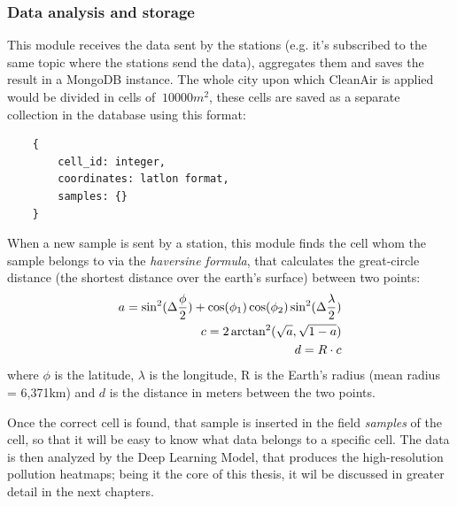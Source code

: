 \documentclass[11pt,a4paper,titlepage]{book}
\begin{document}
\subsubsection{Data analysis and storage}
This module receives the data sent by the stations (e.g. it's subscribed to the same topic where the stations send the data), aggregates them and saves the result in a MongoDB instance.
\newline
\newline
The whole city upon which CleanAir is applied would be divided in cells of $~10000m^2$, these cells are saved as a separate collection in the database using this format:
\begin{center}
\begin{verbatim}
    {
        cell_id: integer,
        coordinates: latlon format,
        samples: {}
    }
\end{verbatim}
\end{center}
When a new sample is sent by a station, this module finds the cell whom the sample belongs to via the \textit{haversine formula}, that calculates the great-circle distance (the shortest distance over the earth's surface) between two points:
\begin{align}
    \label{haversine_formula}
    \notag a = \sin^2(\Delta \frac{\phi}{2}) + \cos(\phi_1) \cos(\phi_2) \sin^2(\Delta \frac{\lambda}{2}) \\ 
    \notag c = 2 \arctan^2(\sqrt{a}, \sqrt{1-a}) \\
    d = R \cdot c
\end{align}
where $\phi$ is the latitude, $\lambda$ is the longitude, R is the Earth's radius (mean radius = 6,371km) and $d$ is the distance in meters between the two points.

Once the correct cell is found, that sample is inserted in the field \textit{samples} of the cell, so that it will be easy to know what data belongs to a specific cell.
\newline
\newline
The data is then analyzed by the Deep Learning Model, that produces the high-resolution pollution heatmaps; being it the core of this thesis, it wil be discussed in greater detail in the next chapters.
\end{document}
